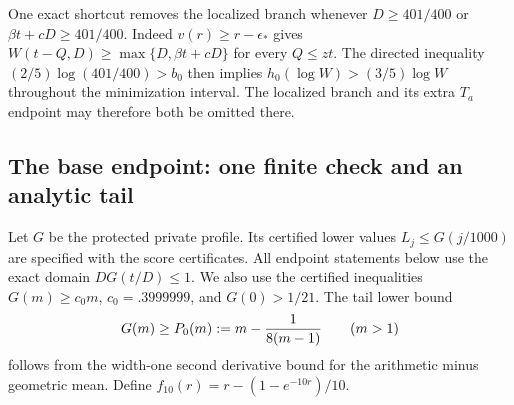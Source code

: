 One exact shortcut removes the localized branch whenever
$D\ge401/400$ or $\beta t+cD\ge401/400$.
Indeed $v(r)\ge r-\epsilon_*$ gives
$W(t-Q,D)\ge\max\{D,\beta t+cD\}$ for every $Q\le zt$.
The directed inequality $(2/5)\log(401/400)>b_0$ then implies
$h_0(\log W)>(3/5)\log W$ throughout the minimization interval.
The localized branch and its extra $T_a$ endpoint may therefore both
be omitted there.

\subsection{The base endpoint: one finite check and an analytic tail}

Let $G$ be the protected private profile.  Its certified lower values
$L_j\le G(j/1000)$ are specified with the score certificates.  All
endpoint statements below use the exact domain $DG(t/D)\le1$.
We also use the certified inequalities
$G(m)\ge c_0m$, $c_0=.3999999$, and $G(0)>1/21$.
The tail lower bound
\[
 G(m)\ge P_0(m):=m-{1\over8(m-1)}\qquad(m>1)
\]
follows from the width-one second derivative bound for the arithmetic
minus geometric mean.  Define $f_{10}(r)=r-(1-e^{-10r})/10$.

